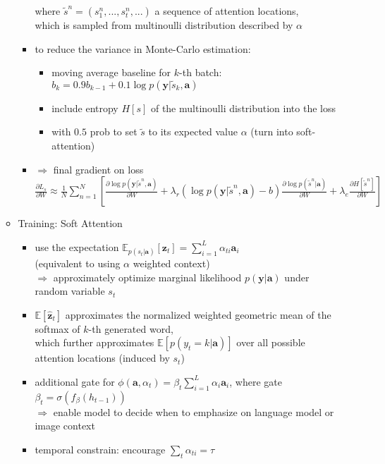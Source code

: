 \begin{itemize}
\begin{itemize}
\begin{itemize}
		where $\tilde s^n = (s_1^n,...,s_t^n,...)$ a sequence of attention locations, \\
		which is sampled from multinoulli distribution described by $\alpha$
		\item to reduce the variance in Monte-Carlo estimation:
			\begin{itemize}
			\item moving average baseline for $k$-th batch: $b_k = 0.9b_{k-1} + 0.1\log p(\mathbf y|\tilde s_k, \mathbf a)$
			\item include entropy $H[s]$ of the multinoulli distribution into the loss
			\item with $0.5$ prob to set $\tilde s$ to its expected value $\alpha$ (turn into soft-attention)
			\end{itemize}
		\item $\Rightarrow$ final gradient on loss \\
		$\displaystyle \frac{\partial L_s}{\partial W} \approx \frac 1 N \sum_{n=1}^N \left[ \frac {\partial \log p(\mathbf y|\tilde s^n, \mathbf a)}{\partial W} + \lambda_r \left( \log p(\mathbf y | \tilde s^n,\mathbf a) - b \right) \frac {\partial \log p(\tilde s^n|\mathbf a)}{\partial W} + \lambda_e \frac{\partial H[\tilde s^n]}{\partial W} \right]$
		\end{itemize}
	\item Training: Soft Attention
		\begin{itemize}
		\item use the expectation $\displaystyle \mathbb E_{p(s_t|\mathbf a)}[\mathbf z_t] = \sum_{i=1}^L \alpha_{ti} \mathbf a_i$ \\
		(equivalent to using $\alpha$ weighted context) \\
		$\Rightarrow$ approximately optimize marginal likelihood $p(\mathbf y|\mathbf a)$ under random variable $s_t$
		\item $\mathbb E[\hat{\mathbf z}_t]$ approximates the normalized weighted geometric mean of the softmax of $k$-th generated word, \\ 
		which further approximates $\mathbb E[p(y_t=k|\mathbf a)]$ over all possible attention locations (induced by $s_t$)
		\item additional gate for $\phi(\mathbf a, \alpha_t) = \beta_t \sum_{i=1}^L \alpha_i \mathbf a_i$, where gate $\beta_t = \sigma(f_\beta(h_{t-1}))$ \\
		$\Rightarrow $ enable model to decide when to emphasize on language model or image context
		\item temporal constrain: encourage $\sum_{t} \alpha_{ti} = \tau$ \\

\end{itemize}
\end{itemize}
\end{itemize}
